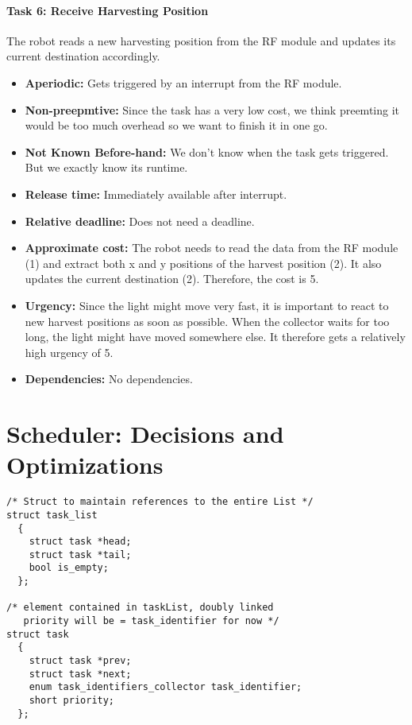 \documentclass[12pt]{article}
\begin{document}
\paragraph{Task 6: Receive Harvesting Position}
The robot reads a new harvesting position from the RF module and updates its current destination accordingly.
  \begin{itemize}
	\item \textbf{Aperiodic:} Gets triggered by an interrupt from the RF module.
	\item \textbf{Non-preepmtive:} Since the task has a very low cost, we think preemting it would be too much overhead so we want to finish it in one go.
  	\item \textbf{Not Known Before-hand:} We don't know when the task gets triggered. But we exactly know its runtime.
  	\item \textbf{Release time:} Immediately available after interrupt.
  	\item \textbf{Relative deadline:} Does not need a deadline.
  	\item \textbf{Approximate cost:} The robot needs to read the data from the RF module (1) and extract both x and y positions of the harvest position (2). It also updates the current destination (2). Therefore, the cost is 5.
  	\item \textbf{Urgency:} Since the light might move very fast, it is important to react to new harvest positions as soon as possible. When the collector waits for too long, the light might have moved somewhere else. It therefore gets a relatively high urgency of 5.
  	\item \textbf{Dependencies:} No dependencies.
   	\end{itemize}


\newpage
\section*{Scheduler: Decisions and Optimizations}

\begin{lstlisting}[]
/* Struct to maintain references to the entire List */
struct task_list
  {
    struct task *head;
    struct task *tail;
    bool is_empty;
  };

/* element contained in taskList, doubly linked
   priority will be = task_identifier for now */
struct task
  {
    struct task *prev;
    struct task *next;
    enum task_identifiers_collector task_identifier;
    short priority;
  };
\end{lstlisting}
\end{document}
